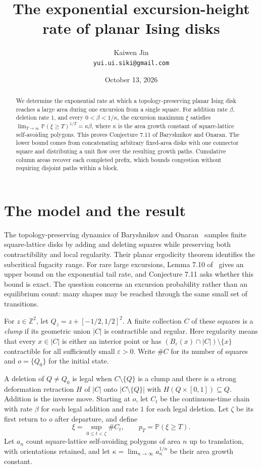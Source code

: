 \documentclass[11pt]{article}
\title{The exponential excursion-height rate of planar Ising disks}
\author{Kaiwen Jin\\\small\texttt{yui.ui.siki@gmail.com}}
\date{October 13, 2026}
\newcommand{\Prob}{\mathbb P}
\begin{document}
\maketitle
\begin{abstract}
We determine the exponential rate at which a topology-preserving planar
Ising disk reaches a large area during one excursion from a single square.
For addition rate $\beta$, deletion rate $1$, and every
$0<\beta<1/\kappa$, the excursion maximum $\xi$ satisfies
$\lim_{T\to\infty}\Prob(\xi\ge T)^{1/T}=\kappa\beta$, where $\kappa$ is
the area growth constant of square-lattice self-avoiding polygons.
This proves Conjecture 7.11 of Baryshnikov and Onaran.
The lower bound comes from concatenating arbitrary fixed-area disks with
one connector square and distributing a unit flow over the resulting
growth paths. Cumulative column areas recover each completed prefix,
which bounds congestion without requiring disjoint paths within a block.
\end{abstract}

\section{The model and the result}

The topology-preserving dynamics of Baryshnikov and Onaran~\cite{BO}
samples finite square-lattice disks by adding and deleting squares while
preserving both contractibility and local regularity. Their planar
ergodicity theorem identifies the subcritical fugacity range. For rare
large excursions, Lemma 7.10 of~\cite{BO} gives an upper bound on the
exponential tail rate, and Conjecture 7.11 asks whether this bound is exact.
The question concerns an excursion probability rather than an equilibrium
count: many shapes may be reached through the same small set of transitions.

For $z\in\mathbb Z^2$, let $Q_z=z+[-1/2,1/2]^2$. A finite collection
$C$ of these squares is a \emph{clump} if its geometric union $|C|$ is
contractible and regular. Here regularity means that every $x\in|C|$ is
either an interior point or has
$(B_\varepsilon(x)\cap|C|)\setminus\{x\}$ contractible for all sufficiently
small $\varepsilon>0$. Write $\#C$ for its number of squares and
$o=\{Q_0\}$ for the initial state.

A deletion of $Q\ne Q_0$ is legal when $C\setminus\{Q\}$ is a clump and
there is a strong deformation retraction $H$ of $|C|$ onto
$|C\setminus\{Q\}|$ with $H(Q\times[0,1])\subseteq Q$. Addition is the
inverse move. Starting at $o$, let $C_t$ be the continuous-time chain with
rate $\beta$ for each legal addition and rate $1$ for each legal deletion.
Let $\zeta$ be its first return to $o$ after departure, and define
\[
 \xi=\sup_{0\le t<\zeta}\#C_t,\qquad p_T=\Prob(\xi\ge T).
\]
Let $a_n$ count square-lattice self-avoiding polygons of area $n$ up to
translation, with orientations retained, and let
$\kappa=\lim_{n\to\infty}a_n^{1/n}$ be their area growth constant.
\end{document}
